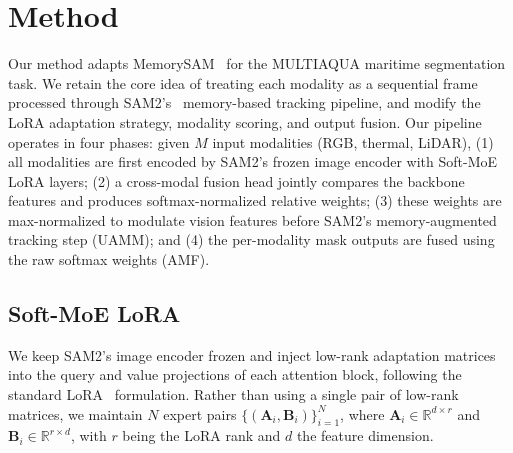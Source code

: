 \section{Method}
\label{sec:method}


Our method adapts MemorySAM~\cite{chen2025memorysam} for the MULTIAQUA maritime segmentation task.
We retain the core idea of treating each modality as a sequential frame processed through SAM2's~\cite{ravi2024sam2} memory-based tracking pipeline, and modify the LoRA adaptation strategy, modality scoring, and output fusion.
Our pipeline operates in four phases: given $M$ input modalities (RGB, thermal, LiDAR), (1) all modalities are first encoded by SAM2's frozen image encoder with Soft-MoE LoRA layers; (2) a cross-modal fusion head jointly compares the backbone features and produces softmax-normalized relative weights; (3) these weights are max-normalized to modulate vision features before SAM2's memory-augmented tracking step (UAMM); and (4) the per-modality mask outputs are fused using the raw softmax weights (AMF).


\subsection{Soft-MoE LoRA}
\label{sec:soft_moe_lora}

We keep SAM2's image encoder frozen and inject low-rank adaptation matrices into the query and value projections of each attention block, following the standard LoRA~\cite{hu2022lora} formulation.
Rather than using a single pair of low-rank matrices, we maintain $N$ expert pairs $\{(\mathbf{A}_i, \mathbf{B}_i)\}_{i=1}^{N}$, where $\mathbf{A}_i \in \mathbb{R}^{d \times r}$ and $\mathbf{B}_i \in \mathbb{R}^{r \times d}$, with $r$ being the LoRA rank and $d$ the feature dimension.

